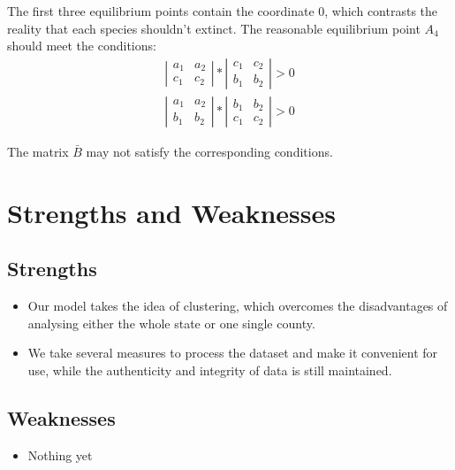 \documentclass[11pt]{article}
\begin{document}
The first three equilibrium points contain the coordinate 0, which contrasts the reality that each species shouldn't extinct. The reasonable equilibrium point $A_{4}$ should meet the conditions:
\begin{gather*}
	\left \vert 
	\begin{matrix}
		a_{1} & a_{2} \\
		c_{1} & c_{2} 
	\end{matrix}
	\right \vert
	\ast
	\left \vert
	\begin{matrix}
		c_{1} & c_{2} \\
		b_{1} & b_{2}
	\end{matrix}
	\right \vert
	> 0 \\
	\left \vert 
	\begin{matrix}
		a_{1} & a_{2} \\
		b_{1} & b_{2} 
	\end{matrix}
	\right \vert
	\ast
	\left \vert
	\begin{matrix}
		b_{1} & b_{2} \\
		c_{1} & c_{2}
	\end{matrix}
	\right \vert
	> 0
\end{gather*}

The matrix $\bar B$ may not satisfy the corresponding conditions.

\section{Strengths and Weaknesses}
\subsection{Strengths}
\begin{itemize}
    \item Our model takes the idea of clustering, which overcomes the disadvantages of analysing either the whole state or one single county.
    \item We take several measures to process the dataset and make it convenient for use, while the authenticity and integrity of data is still maintained.
\end{itemize}

\subsection{Weaknesses}
\begin{itemize}
    \item Nothing yet
 \end{itemize}
\end{document}
